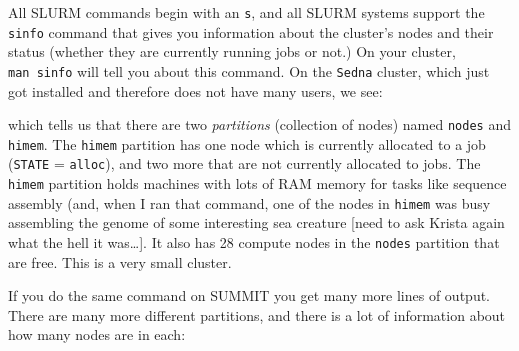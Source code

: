 \documentclass[]{krantz}
\makeatletter
\newenvironment{Shaded}{\begin{snugshade}}{\end{snugshade}}
\newcommand{\ExtensionTok}[1]{#1}
\newcommand{\NormalTok}[1]{#1}
\newenvironment{kframe}{%
\medskip{}
\setlength{\fboxsep}{.8em}
 \def\at@end@of@kframe{}%
 \ifinner\ifhmode%
  \def\at@end@of@kframe{\end{minipage}}%
  \begin{minipage}{\columnwidth}%
 \fi\fi%
 \def\FrameCommand##1{\hskip\@totalleftmargin \hskip-\fboxsep
 \colorbox{shadecolor}{##1}\hskip-\fboxsep
     \hskip-\linewidth \hskip-\@totalleftmargin \hskip\columnwidth}%
 \MakeFramed {\advance\hsize-\width
   \@totalleftmargin\z@ \linewidth\hsize
   \@setminipage}}%
 {\par\unskip\endMakeFramed%
 \at@end@of@kframe}
\renewenvironment{Shaded}{\begin{kframe}}{\end{kframe}}
\makeatother
\begin{document}
All SLURM commands begin with an \texttt{s}, and all SLURM systems support the \texttt{sinfo} command
that gives you information about the cluster's nodes and their status (whether they are currently
running jobs or not.) On your cluster, \texttt{man\ sinfo} will tell you about this command.
On the \texttt{Sedna} cluster, which just got installed and therefore does not
have many users, we see:

\begin{Shaded}
\end{Shaded}

which tells us that there are two \emph{partitions} (collection of nodes)
named \texttt{nodes} and \texttt{himem}. The \texttt{himem} partition has one node which is
currently allocated to a job (\texttt{STATE} = \texttt{alloc}), and two more that
are not currently allocated to jobs. The \texttt{himem} partition holds machines
with lots of RAM memory for tasks like sequence assembly (and, when I ran that
command, one of the nodes in \texttt{himem} was busy assembling the genome of
some interesting sea creature {[}need to ask Krista again what the hell it was\ldots{}{]}.
It also has 28 compute nodes in the
\texttt{nodes} partition that are free. This is a very small cluster.

If you do the same command on SUMMIT you get many more lines of output. There
are many more different partitions, and there is a lot of information about how many
nodes are in each:
\end{document}
